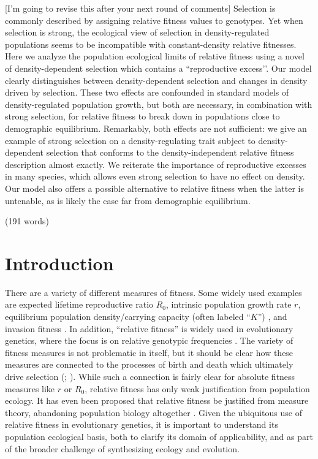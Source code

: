 \documentclass[12pt]{article}
\begin{document}
[I'm going to revise this after your next round of comments]
Selection is commonly described by assigning relative fitness values to genotypes. Yet when selection is strong, the ecological view of selection in density-regulated populations seems to be incompatible with constant-density relative fitnesses. Here we analyze the population ecological limits of relative fitness using a novel of density-dependent selection which contains a ``reproductive excess’’. Our model clearly distinguishes between density-dependent selection and changes in density driven by selection. These two effects are confounded in standard models of density-regulated population growth, but both are necessary, in combination with strong selection, for relative fitness to break down in populations close to demographic equilibrium. Remarkably, both effects are not sufficient: we give an example of strong selection on a density-regulating trait subject to density-dependent selection that conforms to the density-independent relative fitness description almost exactly. We reiterate the importance of reproductive excesses in many species, which allows even strong selection to have no effect on density. Our model also offers a possible alternative to relative fitness when the latter is untenable, as is likely the case far from demographic equilibrium. 

\noindent (191 words)

\newpage{}


\section*{Introduction}

There are a variety of different measures of fitness. Some widely used examples are expected lifetime reproductive ratio $R_0$, intrinsic population growth rate $r$, equilibrium population density/carrying capacity (often labeled ``$K$'') \citep{benton_2000}, and invasion fitness \citep{metz_1992}. In addition, ``relative fitness'' is widely used in evolutionary genetics, where the focus is on relative genotypic frequencies \cite[pp. 468]{barton_2007}. The variety of fitness measures is not problematic in itself, but it should be clear how these measures are connected to the processes of birth and death which ultimately drive selection (\citealt{metcalf_2007,doebeli_2017}; \citealt[pp. 178]{charlesworth_1994}). While such a connection is fairly clear for absolute fitness measures like $r$ or $R_0$, relative fitness has only weak justification from population ecology. It has even been proposed that relative fitness be justified from measure theory, abandoning population biology altogether \citep{wagner_2010}. Given the ubiquitous use of relative fitness in evolutionary genetics, it is important to understand its population ecological basis, both to clarify its domain of applicability, and as part of the broader challenge of synthesizing ecology and evolution.
\end{document}
